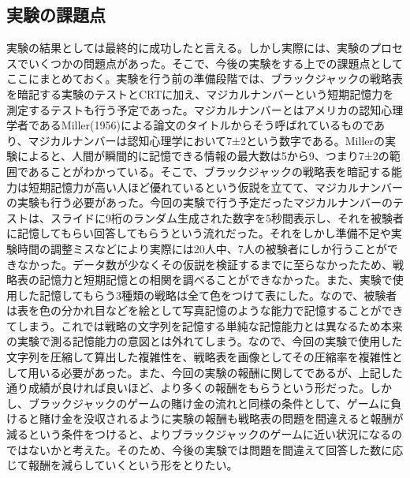 \subsection{実験の課題点}
実験の結果としては最終的に成功したと言える。しかし実際には、実験のプロセスでいくつかの問題点があった。そこで、今後の実験をする上での課題点としてここにまとめておく。実験を行う前の準備段階では、ブラックジャックの戦略表を暗記する実験のテストとCRTに加え、マジカルナンバーという短期記憶力を測定するテストも行う予定であった。マジカルナンバーとはアメリカの認知心理学者であるMiller(1956)による論文のタイトルからそう呼ばれているものであり、マジカルナンバーは認知心理学において7±2という数字である。Millerの実験によると、人間が瞬間的に記憶できる情報の最大数は5から9、つまり7±2の範囲であることがわかっている。そこで、ブラックジャックの戦略表を暗記する能力は短期記憶力が高い人ほど優れているという仮説を立てて、マジカルナンバーの実験も行う必要があった。今回の実験で行う予定だったマジカルナンバーのテストは、スライドに9桁のランダム生成された数字を5秒間表示し、それを被験者に記憶してもらい回答してもらうという流れだった。それをしかし準備不足や実験時間の調整ミスなどにより実際には20人中、7人の被験者にしか行うことができなかった。データ数が少なくその仮説を検証するまでに至らなかったため、戦略表の記憶力と短期記憶との相関を調べることができなかった。また、実験で使用した記憶してもらう3種類の戦略は全て色をつけて表にした。なので、被験者は表を色の分かれ目などを絵として写真記憶のような能力で記憶することができてしまう。これでは戦略の文字列を記憶する単純な記憶能力とは異なるため本来の実験で測る記憶能力の意図とは外れてしまう。なので、今回の実験で使用した文字列を圧縮して算出した複雑性を、戦略表を画像としてその圧縮率を複雑性として用いる必要があった。また、今回の実験の報酬に関してであるが、上記した通り成績が良ければ良いほど、より多くの報酬をもらうという形だった。しかし、ブラックジャックのゲームの賭け金の流れと同様の条件として、ゲームに負けると賭け金を没収されるように実験の報酬も戦略表の問題を間違えると報酬が減るという条件をつけると、よりブラックジャックのゲームに近い状況になるのではないかと考えた。そのため、今後の実験では問題を間違えて回答した数に応じて報酬を減らしていくという形をとりたい。
